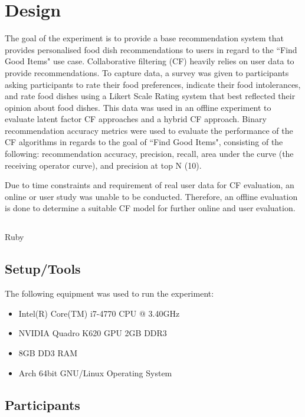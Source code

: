 \section{Design}

The goal of the experiment is to provide a base recommendation system that provides personalised food dish recommendations to users in regard to the ``Find Good Items" use case. Collaborative filtering (CF) heavily relies on user data to provide recommendations. To capture data, a survey was given to participants asking participants to rate their food preferences, indicate their food intolerances, and rate food dishes using a Likert Scale Rating system that best reflected their opinion about food dishes. This data was used in an offline experiment to evaluate latent factor CF approaches and a hybrid CF approach. Binary recommendation accuracy metrics were used to evaluate the performance of the CF algorithms in regards to the goal of ``Find Good Items", consisting of the following: recommendation accuracy, precision, recall, area under the curve (the receiving operator curve), and precision at top N (10). 

Due to time constraints and requirement of real user data for CF evaluation, an online or user study was unable to be conducted. Therefore, an offline evaluation is done to determine a suitable CF model for further online and user evaluation. 


\subsection{}
Ruby
\subsection{Setup/Tools}
The following equipment was used to run the experiment:
\begin{itemize}
	\item{Intel(R) Core(TM) i7-4770 CPU @ 3.40GHz}
	\item{NVIDIA Quadro K620 GPU 2GB DDR3}
	\item{8GB DD3 RAM}
	\item{Arch 64bit GNU/Linux Operating System}
\end{itemize}

\subsection{Participants}

